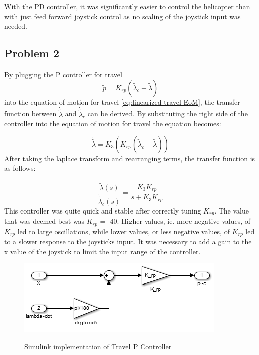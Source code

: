 With the PD controller, it was significantly easier to control the
helicopter than with just feed forward joystick control as no scaling
of the joystick input was needed.

\subsection{Problem 2}
By plugging the P controller for travel
\begin{equation}
\label{travel P controller}
\tilde{p} = K_{rp}(\dot{\tilde{\lambda}}_c - \dot{\tilde{\lambda}})
\end{equation}
into the equation of motion for travel \cref{eq:linearized travel
  EoM}, the transfer function between $\dot{\tilde{\lambda}}$ and
$\dot{\tilde{\lambda}}_c$  can be derived. By substituting the right
side of the controller into the equation of motion for travel the
equation becomes:

\begin{equation}
\label{eq:p controller in travel EoM}
\ddot{\tilde{\lambda}} = K_3(K_{rp}(\dot{\tilde{\lambda}}_c -
\dot{\tilde{\lambda}}))
\end{equation}
After taking the laplace transform and rearranging terms, the transfer
function is as follows:

\begin{equation}
\label{eq:Transfer function between travel and desired travel}
\frac{\dot{\tilde{\lambda}}(s)}{\dot{\tilde{\lambda}}_c(s)} =
\frac{K_3K_{rp}}{s + K_3K_{rp}}
\end{equation}
This controller was quite quick and stable after correctly tuning
$K_{rp}$. The value that was deemed best was $K_{rp}$ = -40. Higher
values, ie. more negative values, of $K_{rp}$ led to large
oscillations, while lower values, or less negative values, of $K_{rp}$
led to a slower response to the joysticks input.  It was necessary
to add a gain to the x value of the joystick to limit the input range
of the controller.
\begin{figure}
\caption{Simulink implementation of Travel P Controller}
	\centering
		\includegraphics{images/TravelPController.png}
	\label{fig:Travel P Controller}
\end{figure}



